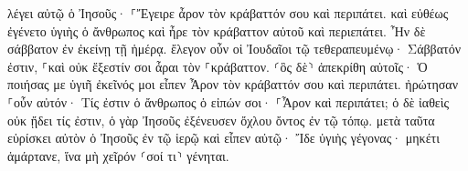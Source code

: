 \documentclass{openreader}
\begin{document}
λέγει αὐτῷ ὁ Ἰησοῦς· ⸀Ἔγειρε ἆρον τὸν κράβαττόν σου καὶ περιπάτει. 
καὶ εὐθέως ἐγένετο ὑγιὴς ὁ ἄνθρωπος καὶ ἦρε τὸν κράβαττον αὐτοῦ καὶ περιεπάτει. Ἦν δὲ σάββατον ἐν ἐκείνῃ τῇ ἡμέρᾳ. 
ἔλεγον οὖν οἱ Ἰουδαῖοι τῷ τεθεραπευμένῳ· Σάββατόν ἐστιν, ⸀καὶ οὐκ ἔξεστίν σοι ἆραι τὸν ⸀κράβαττον. 
⸂ὃς δὲ⸃ ἀπεκρίθη αὐτοῖς· Ὁ ποιήσας με ὑγιῆ ἐκεῖνός μοι εἶπεν Ἆρον τὸν κράβαττόν σου καὶ περιπάτει. 
ἠρώτησαν ⸀οὖν αὐτόν· Τίς ἐστιν ὁ ἄνθρωπος ὁ εἰπών σοι· ⸀Ἆρον καὶ περιπάτει; 
ὁ δὲ ἰαθεὶς οὐκ ᾔδει τίς ἐστιν, ὁ γὰρ Ἰησοῦς ἐξένευσεν ὄχλου ὄντος ἐν τῷ τόπῳ. 
μετὰ ταῦτα εὑρίσκει αὐτὸν ὁ Ἰησοῦς ἐν τῷ ἱερῷ καὶ εἶπεν αὐτῷ· Ἴδε ὑγιὴς γέγονας· μηκέτι ἁμάρτανε, ἵνα μὴ χεῖρόν ⸂σοί τι⸃ γένηται. 
\end{document}
